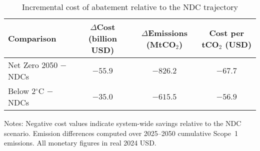 \begin{table}[ht]
  \centering
  \caption{Incremental cost of abatement relative to the NDC trajectory}
  \label{tab:cost-abatement}
  \begin{threeparttable}
  \begin{tabular}{@{}lccc@{}}
    \toprule
    Comparison & $\Delta$Cost (billion USD) & $\Delta$Emissions (MtCO$_2$) & Cost per tCO$_2$ (USD) \\
    \midrule
    Net Zero 2050 $-$ NDCs & $-55.9$ & $-826.2$ & $-67.7$ \\
    Below 2$^\circ$C $-$ NDCs & $-35.0$ & $-615.5$ & $-56.9$ \\
    \bottomrule
  \end{tabular}
  \begin{tablenotes}
    \footnotesize
    \item Notes: Negative cost values indicate system-wide savings relative to the NDC scenario. Emission differences computed over 2025--2050 cumulative Scope~1 emissions. All monetary figures in real 2024 USD.
  \end{tablenotes}
  \end{threeparttable}
\end{table}

